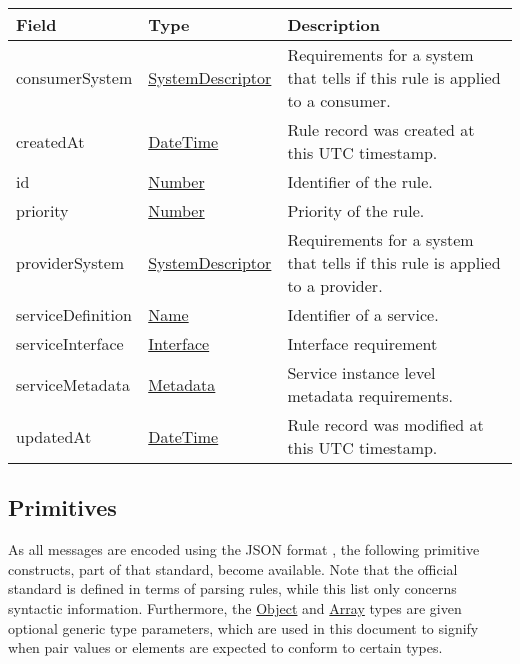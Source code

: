 \documentclass[a4paper]{arrowhead}
\newcommand{\pref}[1]{{\textcolor{ArrowheadGrey}{\hyperref[sec:model:primitives:#1]{#1}}}}
\begin{document}
\begin{table}[ht!]
\begin{tabularx}{\textwidth}{| p{4.25cm} | p{3.5cm} | X |} \hline
\rowcolor{gray!33} Field & Type      & Description \\ \hline
consumerSystem & \hyperref[sec:model:SystemDescriptor]{SystemDescriptor} & Requirements for a system that tells if this rule is applied to a consumer. \\ \hline
createdAt & \pref{DateTime} & Rule record was created at this UTC time\-stamp. \\ \hline
id & \pref{Number} & Identifier of the rule. \\ \hline
priority & \pref{Number} & Priority of the rule. \\ \hline
providerSystem & \hyperref[sec:model:SystemDescriptor]{SystemDescriptor} & Requirements for a system that tells if this rule is applied to a provider. \\ \hline
serviceDefinition & \pref{Name} &  Identifier of a service. \\ \hline
serviceInterface & \pref{Interface} & Interface requirement \\ \hline
serviceMetadata & \hyperref[sec:model:Metadata]{Metadata} & Service instance level metadata requirements. \\ \hline
updatedAt & \pref{DateTime} & Rule record was modified at this UTC time\-stamp. \\ \hline
\end{tabularx}
\end{table}

\subsection{Primitives}
\label{sec:model:primitives}

As all messages are encoded using the JSON format \cite{bray2014json}, the following primitive constructs, part of that standard, become available.
Note that the official standard is defined in terms of parsing rules, while this list only concerns syntactic information.
Furthermore, the \pref{Object} and \pref{Array} types are given optional generic type parameters, which are used in this document to signify when pair values or elements are expected to conform to certain types. 
\end{document}
